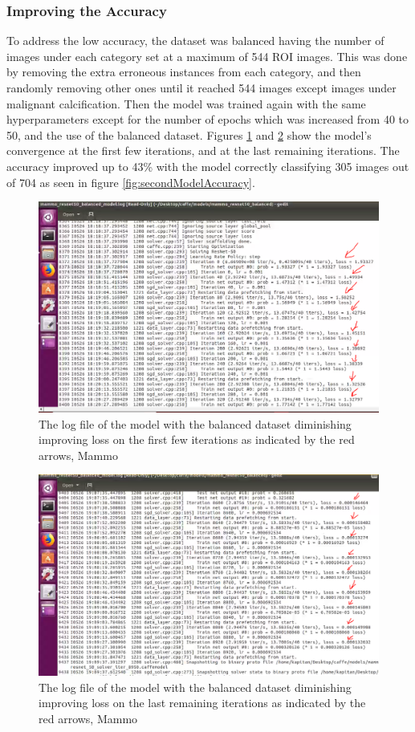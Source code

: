 \subsubsection{Improving the Accuracy}
\qquad To address the low accuracy, the dataset was balanced having the number of images under each category set at a maximum of 544 ROI images. This was done by removing the extra erroneous instances from each category, and then randomly removing other ones until it reached 544 images except images under malignant calcification. Then the model was trained again with the same hyperparameters except for the number of epochs which was increased from 40 to 50, and the use of the balanced dataset. Figures \ref{fig:secondModelLog1} and \ref{fig:secondModelLog2} show the model's convergence at the first few iterations, and at the last remaining iterations. The accuracy improved up to 43\% with the model correctly classifying 305 images out of 704 as seen in figure \ref{fig:secondModelAccuracy}.

\begin{figure}[h]
	\centering
  	\includegraphics[scale=0.5]{images/secondModelLog.png}
	\caption{The log file of the model with the balanced dataset diminishing improving loss on the first few iterations as indicated by the red arrows, Mammo}
  	\label{fig:secondModelLog1}
\end{figure}

\begin{figure}[h]
	\centering
  	\includegraphics[scale=0.5]{images/secondModelLog2.png}
	\caption{The log file of the model with the balanced dataset diminishing improving loss on the last remaining iterations as indicated by the red arrows, Mammo}
  	\label{fig:secondModelLog2}
\end{figure}

